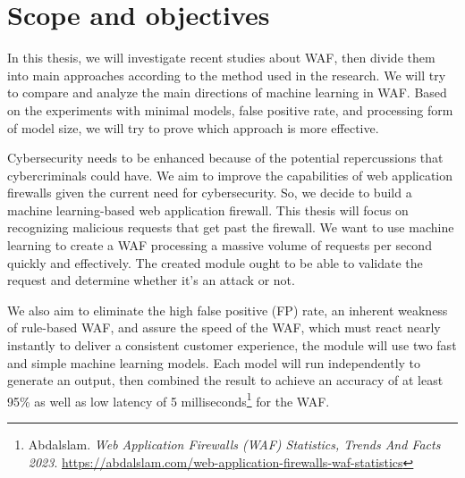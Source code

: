 \section{Scope and objectives}
\label{sec:objectives}
\hspace{0.5cm}In this thesis, we will investigate recent studies about WAF, then divide them into main approaches according to the method used in the research. We will try to compare and analyze the main directions of machine learning in WAF. Based on the experiments with minimal models, false positive rate, and processing form of model size, we will try to prove which approach is more effective.

Cybersecurity needs to be enhanced because of the potential repercussions that cybercriminals could have. We aim to improve the capabilities of web application firewalls given the current need for cybersecurity. So, we decide to build a machine learning-based web application firewall. This thesis will focus on recognizing malicious requests that get past the firewall. We want to use machine learning to create a WAF processing a massive volume of requests per second quickly and effectively. The created module ought to be able to validate the request and determine whether it's an attack or not.

We also aim to eliminate the high false positive (FP) rate, an inherent weakness of rule-based WAF, and assure the speed of the WAF, which must react nearly instantly to deliver a consistent customer experience, the module will use two fast and simple machine learning models. Each model will run independently to generate an output, then combined the result to achieve an accuracy of at least 95\% as well as low latency of 5 milliseconds\footnote{Abdalslam. \textit{Web Application Firewalls (WAF) Statistics, Trends And Facts 2023}. 
\url{https://abdalslam.com/web-application-firewalls-waf-statistics}} for the WAF.

